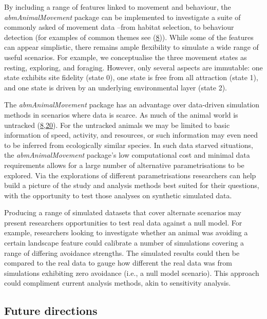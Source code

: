 \documentclass[10pt,a4paper]{article}
\begin{document}
By including a range of features linked to movement and behaviour, the \emph{abmAnimalMovement} package can be implemented to investigate a suite of commonly asked of movement data --from habitat selection, to behaviour detection (for examples of common themes see (\protect\hyperlink{ref-joo_recent_2022}{8})).
While some of the features can appear simplistic, there remains ample flexibility to simulate a wide range of useful scenarios.
For example, we conceptualise the three movement states as resting, exploring, and foraging.
However, only several aspects are immutable: one state exhibits site fidelity (state 0), one state is free from all attraction (state 1), and one state is driven by an underlying environmental layer (state 2).

The \emph{abmAnimalMovement} package has an advantage over data-driven simulation methods in scenarios where data is scarce.
As much of the animal world is untracked (\protect\hyperlink{ref-joo_recent_2022}{8},\protect\hyperlink{ref-crane_lots_2021}{20}).
For the untracked animals we may be limited to basic information of speed, activity, and resources, or such information may even need to be inferred from ecologically similar species.
In such data starved situations, the \emph{abmAnimalMovement} package's low computational cost and minimal data requirements allows for a large number of alternative parametrisations to be explored.
Via the explorations of different parametrisations researchers can help build a picture of the study and analysis methods best suited for their questions, with the opportunity to test those analyses on synthetic simulated data.

Producing a range of simulated datasets that cover alternate scenarios may present researchers opportunities to test real data against a null model.
For example, researchers looking to investigate whether an animal was avoiding a certain landscape feature could calibrate a number of simulations covering a range of differing avoidance strengths.
The simulated results could then be compared to the real data to gauge how different the real data was from simulations exhibiting zero avoidance (i.e., a null model scenario).
This approach could compliment current analysis methods, akin to sensitivity analysis.

\hypertarget{future-directions}{%
\subsection{Future directions}\label{future-directions}}
\end{document}
